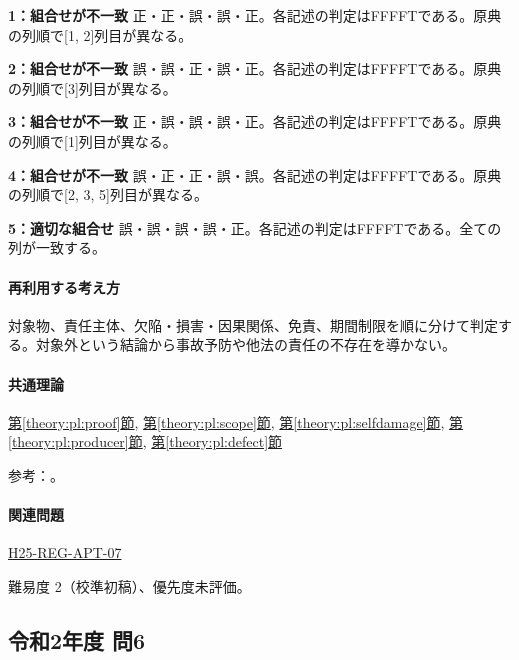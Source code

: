 \noindent\textbf{1：組合せが不一致} 正・正・誤・誤・正。各記述の判定はFFFFTである。原典の列順で[1, 2]列目が異なる。\par

\noindent\textbf{2：組合せが不一致} 誤・誤・正・誤・正。各記述の判定はFFFFTである。原典の列順で[3]列目が異なる。\par

\noindent\textbf{3：組合せが不一致} 正・誤・誤・誤・正。各記述の判定はFFFFTである。原典の列順で[1]列目が異なる。\par

\noindent\textbf{4：組合せが不一致} 誤・正・正・誤・誤。各記述の判定はFFFFTである。原典の列順で[2, 3, 5]列目が異なる。\par

\noindent\textbf{5：適切な組合せ} 誤・誤・誤・誤・正。各記述の判定はFFFFTである。全ての列が一致する。\par

\paragraph{再利用する考え方} 対象物、責任主体、欠陥・損害・因果関係、免責、期間制限を順に分けて判定する。対象外という結論から事故予防や他法の責任の不存在を導かない。

\paragraph{共通理論} \hyperref[theory:pl:proof]{第\ref*{theory:pl:proof}節}, \hyperref[theory:pl:scope]{第\ref*{theory:pl:scope}節}, \hyperref[theory:pl:selfdamage]{第\ref*{theory:pl:selfdamage}節}, \hyperref[theory:pl:producer]{第\ref*{theory:pl:producer}節}, \hyperref[theory:pl:defect]{第\ref*{theory:pl:defect}節}

\par 参考：\cite{pl_statute,pl_qa,pl_definitions2018}。

\paragraph{関連問題} \hyperref[q:h25-reg-apt-07]{H25-REG-APT-07}

\par 難易度 2（校準初稿）、優先度未評価。

\subsection{令和2年度 問6}
\label{q:r02-reg-apt-06}

